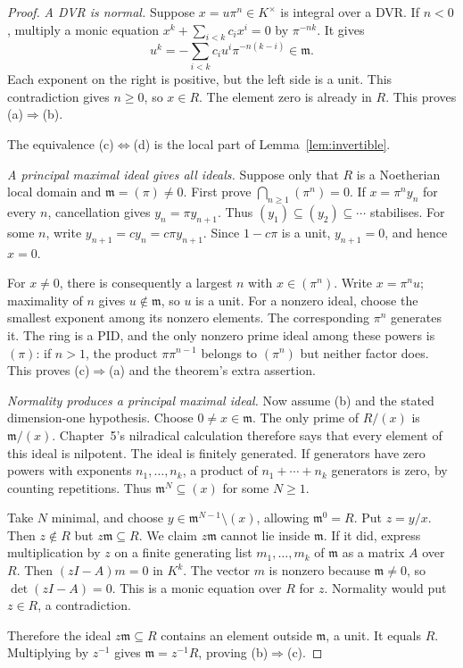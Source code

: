\begin{proof}
\emph{A DVR is normal.} Suppose $x=u\pi^n\in K^\times$ is integral over a DVR. If $n<0$, multiply a monic equation $x^k+\sum_{i<k}c_ix^i=0$ by $\pi^{-nk}$. It gives
\[
 u^k=-\sum_{i<k}c_iu^i\pi^{-n(k-i)}\in\mathfrak m.
\]
Each exponent on the right is positive, but the left side is a unit. This contradiction gives $n\ge0$, so $x\in R$. The element zero is already in $R$. This proves (a)$\Rightarrow$(b).

The equivalence (c)$\Leftrightarrow$(d) is the local part of Lemma~\ref{lem:invertible}.

\emph{A principal maximal ideal gives all ideals.} Suppose only that $R$ is a Noetherian local domain and $\mathfrak m=(\pi)\ne0$. First prove $\bigcap_{n\ge1}(\pi^n)=0$. If $x=\pi^ny_n$ for every $n$, cancellation gives $y_n=\pi y_{n+1}$. Thus $(y_1)\subseteq(y_2)\subseteq\cdots$ stabilises. For some $n$, write $y_{n+1}=cy_n=c\pi y_{n+1}$. Since $1-c\pi$ is a unit, $y_{n+1}=0$, and hence $x=0$.

For $x\ne0$, there is consequently a largest $n$ with $x\in(\pi^n)$. Write $x=\pi^nu$; maximality of $n$ gives $u\notin\mathfrak m$, so $u$ is a unit. For a nonzero ideal, choose the smallest exponent among its nonzero elements. The corresponding $\pi^n$ generates it. The ring is a PID, and the only nonzero prime ideal among these powers is $(\pi)$: if $n>1$, the product $\pi\pi^{n-1}$ belongs to $(\pi^n)$ but neither factor does. This proves (c)$\Rightarrow$(a) and the theorem's extra assertion.

\emph{Normality produces a principal maximal ideal.} Now assume (b) and the stated dimension-one hypothesis. Choose $0\ne x\in\mathfrak m$. The only prime of $R/(x)$ is $\mathfrak m/(x)$. Chapter~5's nilradical calculation therefore says that every element of this ideal is nilpotent. The ideal is finitely generated. If generators have zero powers with exponents $n_1,\ldots,n_k$, a product of $n_1+\cdots+n_k$ generators is zero, by counting repetitions. Thus $\mathfrak m^N\subseteq(x)$ for some $N\ge1$.

Take $N$ minimal, and choose $y\in\mathfrak m^{N-1}\setminus(x)$, allowing $\mathfrak m^0=R$. Put $z=y/x$. Then $z\notin R$ but $z\mathfrak m\subseteq R$. We claim $z\mathfrak m$ cannot lie inside $\mathfrak m$. If it did, express multiplication by $z$ on a finite generating list $m_1,\ldots,m_k$ of $\mathfrak m$ as a matrix $A$ over $R$. Then $(zI-A)m=0$ in $K^k$. The vector $m$ is nonzero because $\mathfrak m\ne0$, so $\det(zI-A)=0$. This is a monic equation over $R$ for $z$. Normality would put $z\in R$, a contradiction.

Therefore the ideal $z\mathfrak m\subseteq R$ contains an element outside $\mathfrak m$, a unit. It equals $R$. Multiplying by $z^{-1}$ gives $\mathfrak m=z^{-1}R$, proving (b)$\Rightarrow$(c).
\end{proof}

